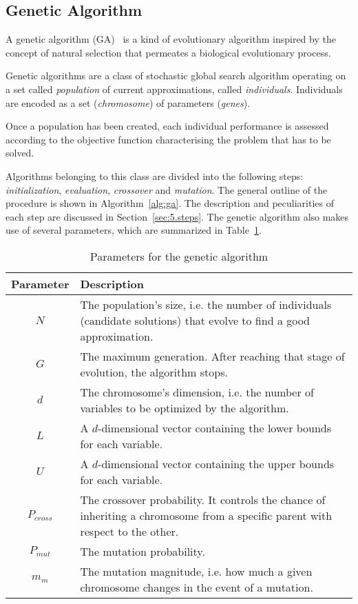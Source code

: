 \subsection{Genetic Algorithm}

A genetic algorithm (GA)~\cite{fleming2001genetic} is a kind of evolutionary algorithm inspired
by the concept of natural selection that permeates a biological evolutionary process.

Genetic algorithms are a class of stochastic global search algorithm
operating on a set called \textit{population} of current approximations,
called \textit{individuals}.
Individuals are encoded as a set (\textit{chromosome}) of parameters (\textit{genes}).

Once a population has been created, each individual performance is assessed
according to the objective function characterising the problem that has to be solved.

Algorithms belonging to this class are divided into the following steps:
\textit{initialization}, \textit{evaluation}, \textit{crossover} and \textit{mutation}.
The general outline of the procedure is shown in Algorithm~\ref{alg:ga}.
The description and peculiarities of each step are discussed in Section~\ref{sec:5.steps}.
The genetic algorithm also makes use of several parameters, which are summarized
in Table~\ref{tab:ga_params}.

\begin{table}[]
	\centering
	\begin{tabularx}{\linewidth}{c X}
		\toprule
		\textbf{Parameter} & \textbf{Description} \\ \midrule
		$N$        & The population's size, i.e. the number of individuals (candidate solutions) that evolve to find a good approximation. \\
		$G$         & The maximum generation. After reaching that stage of evolution, the algorithm stops. \\
		$d$           	   & The chromosome's dimension, i.e. the number of variables to be optimized by the algorithm. \\
		$L$           	   & A $d$-dimensional vector containing the lower bounds for each variable. \\
		$U$				   & A $d$-dimensional vector containing the upper bounds for each variable. \\
		$P_{cross}$		   & The crossover probability. It controls the chance of inheriting a chromosome from a specific parent with respect to the other. \\
		$P_{mut}$		   & The mutation probability. \\
		$m_m$			   & The mutation magnitude, i.e. how much a given chromosome changes in the event of a mutation. \\ \bottomrule
	\end{tabularx}
	\caption{Parameters for the genetic algorithm}
	\label{tab:ga_params}
\end{table}

